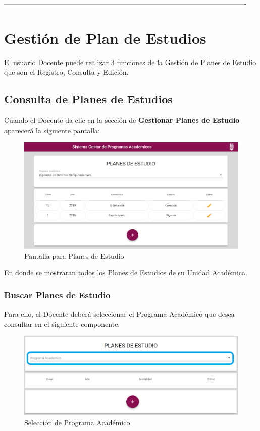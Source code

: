  -------------------------------------------------------------------------------------------------------

\chapter{Gestión de Plan de Estudios}
El usuario Docente puede realizar 3 funciones de la Gestión de Planes de Estudio que son el Registro, Consulta y Edición.
\section{Consulta de Planes de Estudios}
Cuando el Docente da clic en la sección de \textbf{Gestionar Planes de Estudio} aparecerá la siguiente pantalla:


\begin{figure}[!hbtp]
	\centering
	\hypertarget{consultarPE}{\includegraphics[width=0.7\linewidth]{images/SP4-GPE/consultar}}
	\caption{Pantalla para Planes de Estudio}
	\label{consultarPE}
\end{figure}

En donde se mostraran todos los Planes de Estudios de su Unidad Académica.
\newpage
\subsection{Buscar Planes de Estudio}

Para ello, el Docente deberá seleccionar el Programa Académico que desea consultar en el siguiente componente:

\begin{figure}[!hbtp]
	\centering
	\hypertarget{academico}{\includegraphics[width=0.7\linewidth]{images/SP4-GPE/programa}}
	\caption{Selección de Programa Académico}
	\label{academico}
\end{figure}

